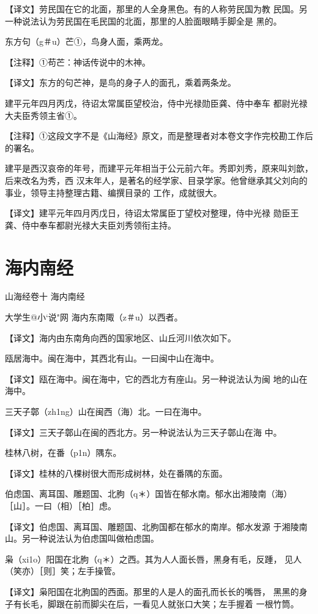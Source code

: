 \documentclass[a4paper,12pt,UTF8,twoside]{ctexbook}
\begin{document}
【译文】劳民国在它的北面，那里的人全身黑色。有的人称劳民国为教 民国。另一种说法认为劳民国在毛民国的北面，那里的人脸面眼睛手脚全是 黑的。

东方句（g＃u）芒①，鸟身人面，乘两龙。

【注释】①苟芒：神话传说中的木神。

【译文】东方的句芒神，是鸟的身子人的面孔，乘着两条龙。

建平元年四月丙戊，待诏太常属臣望校治，侍中光禄勋臣龚、侍中奉车 都尉光禄大夫臣秀领主省①。

【注释】①这段文字不是《山海经》原文，而是整理者对本卷文字作完校勘工作后的署名。

建平是西汉哀帝的年号，而建平元年相当于公元前六年。秀即刘秀，原来叫刘歆，后来改名为秀，西 汉末年人，是著名的经学家、目录学家。他曾继承其父刘向的事业，领导主持整理古籍、编撰目录的 工作，成就很大。

【译文】建平元年四月丙戊日，待诏太常属臣丁望校对整理，侍中光禄 勋臣王龚、侍中奉车都尉光禄大夫臣刘秀领衔主持。

\chapter{海内南经}

山海经卷十 海内南经

大$学$生@小`说"网
海内东南陬（z＃u）以西者。

【译文】海内由东南角向西的国家地区、山丘河川依次如下。

瓯居海中。闽在海中，其西北有山。一曰闽中山在海中。

【译文】瓯在海中。闽在海中，它的西北方有座山。另一种说法认为闽 地的山在海中。

三天子鄣（zh1ng）山在闽西（海）北。一曰在海中。

【译文】三天子鄣山在闽的西北方。另一种说法认为三天子鄣山在海 中。

桂林八树，在番（p1n）隅东。

【译文】桂林的八棵树很大而形成树林，处在番隅的东面。

伯虑国、离耳国、雕题国、北朐（q＊）国皆在郁水南。郁水出湘陵南（海） ［山］。一曰（相）［柏］虑。

【译文】伯虑国、离耳国、雕题国、北朐国都在郁水的南岸。郁水发源 于湘陵南山。另一种说法认为伯虑国叫做柏虑国。

枭（xi1o）阳国在北朐（q＊）之西。其为人人面长唇，黑身有毛，反踵， 见人（笑亦）［则］笑；左手操管。

【译文】枭阳国在北朐国的西面。那里的人是人的面孔而长长的嘴唇， 黑黑的身子有长毛，脚跟在前而脚尖在后，一看见人就张口大笑；左手握着 一根竹筒。
\end{document}
